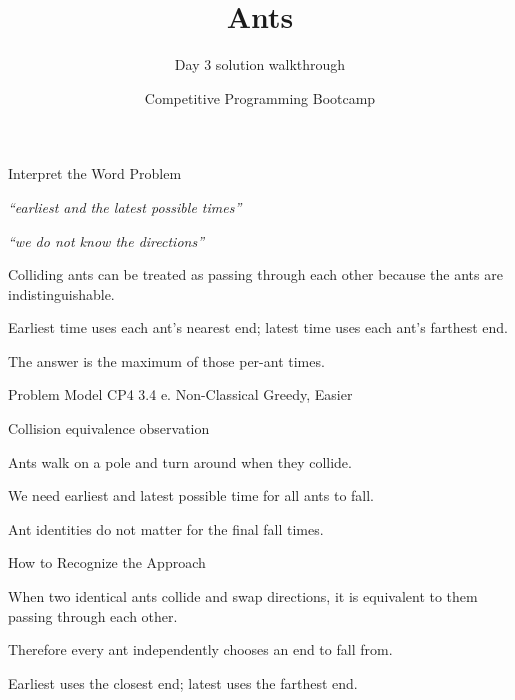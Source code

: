 \documentclass[aspectratio=169,11pt]{beamer}
\title[ants]{Ants}
\subtitle{Day 3 solution walkthrough}
\author[Solution Deck]{Competitive Programming Bootcamp}
\date{}
\begin{document}
\begin{frame}[plain]
  \titlepage
\end{frame}

\begin{frame}{Interpret the Word Problem}
\small
{}
\begin{tightitemize}
  \item \textit{``earliest and the latest possible times''}
  \item \textit{``we do not know the directions''}
\end{tightitemize}

\vspace{0.18cm}
\begin{tightitemize}
  \item Colliding ants can be treated as passing through each other because the ants are indistinguishable.
  \item Earliest time uses each ant's nearest end; latest time uses each ant's farthest end.
  \item The answer is the maximum of those per-ant times.
\end{tightitemize}
\end{frame}







\begin{frame}{Problem Model}
\small
{} CP4 3.4 e. Non-Classical Greedy, Easier

\vspace{0.25cm}
 Collision equivalence observation

\vspace{0.25cm}
\begin{tightitemize}
  \item Ants walk on a pole and turn around when they collide.
  \item We need earliest and latest possible time for all ants to fall.
  \item Ant identities do not matter for the final fall times.
\end{tightitemize}
\end{frame}

\begin{frame}{How to Recognize the Approach}
\begin{tightitemize}
  \item When two identical ants collide and swap directions, it is equivalent to them passing through each other.
  \item Therefore every ant independently chooses an end to fall from.
  \item Earliest uses the closest end; latest uses the farthest end.
\end{tightitemize}
\end{frame}
\end{document}
